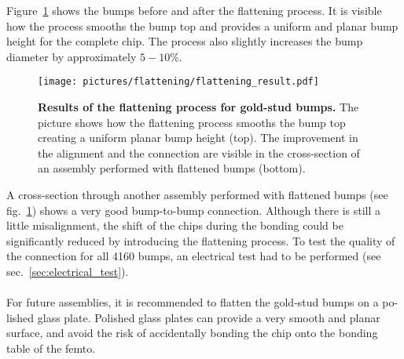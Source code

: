 Figure~\ref{fig:flattening_results} shows the bumps before and after the flattening process. It is visible how the process smooths the bump top and provides a uniform and planar bump height for the complete chip. The process also slightly increases the bump diameter by approximately $5-10\%$.
\begin{figure}
\begin{center}
\texttt{[image: pictures/flattening/flattening\_result.pdf]}
\end{center}
\caption[Results of the flattening process for gold-stud bumps]{\textbf{Results of the flattening process for gold-stud bumps.} The picture shows how the flattening process smooths the bump top creating a uniform planar bump height (top). The improvement in the alignment and the connection are visible in the cross-section of an assembly performed with flattened bumps (bottom).}\label{fig:flattening_results}
\end{figure}
A cross-section through another assembly performed with flattened bumps (see fig.~\ref{fig:flattening_results}) shows a very good bump-to-bump connection. Although there is still a little misalignment, the shift of the chips during the bonding could be significantly reduced by introducing the flattening process. To test the quality of the connection for all 4160 bumps, an electrical test had to be performed (see sec.~\ref{sec:electrical_test}).
\\
\\For future assemblies, it is recommended to flatten the gold-stud bumps on a po-lished glass plate. Polished glass plates can provide a very smooth and planar surface, and avoid the risk of accidentally bonding the chip onto the bonding table of the femto.


